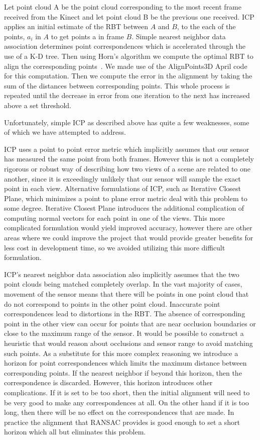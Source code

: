 \documentclass[letterpaper, 10pt, conference]{ieeeconf}
\begin{document}
	Let point cloud A be the point cloud corresponding to the most recent frame received from the Kinect and let point cloud B be the previous one received.  ICP applies an initial estimate of the RBT between $A$ and $B$, to the each of the points, $a_{i}$ in $A$ to get points a in frame $B$.  Simple nearest neighbor data association determines point correspondences which is accelerated through the use of a K-D tree.  Then using Horn's algorithm we compute the optimal RBT to align the corresponding points~\cite{horn1987closed}.  We made use of the AlignPoints3D April code for this computation.  Then we compute the error in the alignment by taking the sum of the distances between corresponding points.  This whole process is repeated until the decrease in error from one iteration to the next has increased above a set threshold.

	Unfortunately, simple ICP as described above has quite a few weaknesses, some of which we have attempted to address.

	ICP uses a point to point error metric which implicitly assumes that our sensor has measured the same point from both frames.  However this is not a completely rigorous or robust way of describing how two views of a scene are related to one another, since it is exceedingly unlikely that our sensor will sample the exact point in each view.  Alternative formulations of ICP, such as Iterative Closest Plane, which minimizes a point to plane error metric deal with this problem to some degree.  Iterative Closest Plane introduces the additional complication of computing normal vectors for each point in one of the views.  This more complicated formulation would yield improved accuracy, however there are other areas where we could improve the project that would provide greater benefits for less cost in development time, so we avoided utilizing this more difficult formulation.

	ICP's nearest neighbor data association also implicitly assumes that the two point clouds being matched completely overlap.  In the vast majority of cases, movement of the sensor means that there will be points in one point cloud that do not correspond to points in the other point cloud.  Inaccurate point correspondences lead to distortions in the RBT.  The absence of corresponding point in the other view can occur for points that are near occlusion boundaries or close to the maximum range of the sensor.  It would be possible to construct a heuristic that would reason about occlusions and sensor range to avoid matching such points.  As a substitute for this more complex reasoning we introduce a horizon for point correspondences which limits the maximum distance between corresponding points.   If the nearest neighbor if beyond this horizon, then the correspondence is discarded.  However, this horizon introduces other complications.  If it is set to be too short, then the initial alignment will need to be very good to make any correspondences at all.  On the other hand if it is too long, then there will be no effect on the correspondences that are made.  In practice the alignment that RANSAC provides is good enough  to set a short horizon which all but eliminates this problem.
\end{document}

